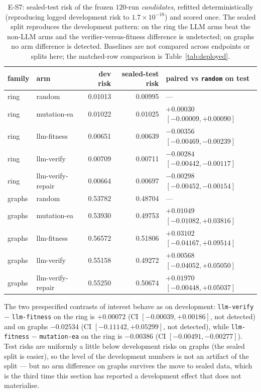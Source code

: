 \documentclass{neurips_2024}
\begin{document}
\begin{table}[t]
\centering
\caption{E-S7: sealed-test risk of the frozen $120$-run \emph{candidates}, refitted
deterministically (reproducing logged development risk to $1.7\times10^{-18}$) and scored
once. The sealed split reproduces the development pattern: on the ring the LLM arms beat the
non-LLM arms and the verifier-versus-fitness difference is undetected; on graphs no arm
difference is detected. Baselines are not compared across endpoints or splits here; the
matched-row comparison is Table~\ref{tab:deployed}.}
\label{tab:holdout}
\small
\begin{tabular}{@{}llrrl@{}}
\toprule
family & arm & dev risk & sealed-test risk & paired vs \texttt{random} on test \\
\midrule
ring & random            & 0.01013 & 0.00995 & --- \\
ring & mutation-ea       & 0.01022 & 0.01025 & $+0.00030$ $[-0.00009,+0.00090]$ \\
ring & llm-fitness       & 0.00651 & 0.00639 & $\mathbf{-0.00356}$ $[-0.00469,-0.00239]$ \\
ring & llm-verify        & 0.00709 & 0.00711 & $\mathbf{-0.00284}$ $[-0.00442,-0.00117]$ \\
ring & llm-verify-repair & 0.00664 & 0.00697 & $\mathbf{-0.00298}$ $[-0.00452,-0.00154]$ \\
\midrule
graphs & random          & 0.53782 & 0.48704 & --- \\
graphs & mutation-ea     & 0.53930 & 0.49753 & $+0.01049$ $[-0.01082,+0.03816]$ \\
graphs & llm-fitness     & 0.56572 & 0.51806 & $+0.03102$ $[-0.04167,+0.09514]$ \\
graphs & llm-verify      & 0.55158 & 0.49272 & $+0.00568$ $[-0.04052,+0.05050]$ \\
graphs & llm-verify-repair & 0.55250 & 0.50674 & $+0.01970$ $[-0.00448,+0.05037]$ \\
\bottomrule
\end{tabular}
\end{table}

The two prespecified contrasts of interest behave as on development:
\texttt{llm-verify} $-$ \texttt{llm-fitness} on the ring is $+0.00072$
(CI $[-0.00039,+0.00186]$, not detected) and on graphs $-0.02534$
(CI $[-0.11142,+0.05299]$, not detected), while \texttt{llm-fitness} $-$
\texttt{mutation-ea} on the ring is $-0.00386$ (CI $[-0.00491,-0.00277]$). Test risks are
uniformly a little below development risks on graphs (the sealed split is easier), so the
level of the development numbers is not an artifact of the split --- but no arm difference on
graphs survives the move to sealed data, which is the third time this section has reported a
development effect that does not materialise.
\end{document}
